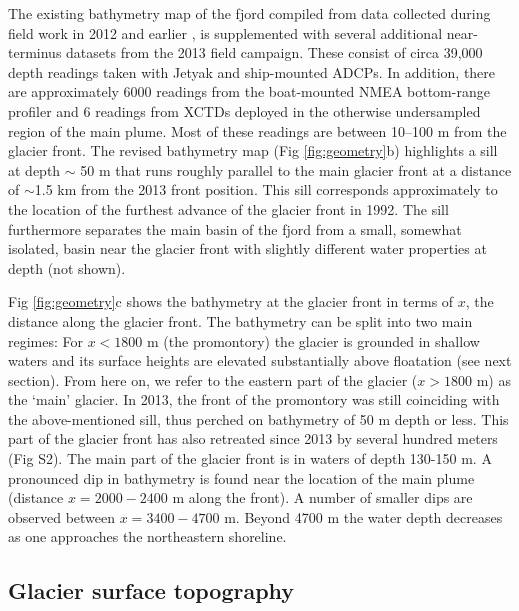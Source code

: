 \documentclass[30pt,letterpaper]{article}
\begin{document}
The existing bathymetry map of the fjord compiled from data collected during field work in 2012 and earlier \citep{Stevens:2016tx}, is supplemented with several additional near-terminus datasets from the 2013 field campaign. These consist of circa 39,000 depth readings taken with Jetyak and ship-mounted ADCPs. In addition, there are approximately 6000 readings from the boat-mounted NMEA bottom-range profiler and 6 readings from XCTDs deployed in the otherwise undersampled region of the main plume. Most of these readings are between 10--100 m from the glacier front. The revised bathymetry map (Fig \ref{fig:geometry}b) highlights a sill at depth $\sim$ 50 m that runs roughly parallel to the main glacier front at a distance of $\sim$1.5 km from the 2013 front position. This sill corresponds approximately to the location of the furthest advance of the glacier front in 1992. The sill furthermore separates the main basin of the fjord from a small, somewhat isolated, basin near the glacier front with slightly different water properties at depth (not shown). 

Fig \ref{fig:geometry}c shows the bathymetry at the glacier front in terms of $x$, the distance along the glacier front. The bathymetry can be split into two main regimes: For $x < 1800$ m (the promontory) the glacier is grounded in shallow waters and its surface heights are elevated substantially above floatation (see next section). From here on, we refer to the eastern part of the glacier ($x > 1800$ m) as the `main' glacier. In 2013, the front of the promontory was still coinciding with the above-mentioned sill, thus perched on bathymetry of  50 m depth or less. This part of the glacier front has also retreated since 2013 by several hundred meters (Fig S2). The main part of the glacier front is in waters of depth 130-150 m. A pronounced dip in bathymetry is found near the location of the main plume (distance $x = 2000 - 2400$ m along the front). A number of smaller dips are observed between $x = 3400 - 4700$ m. Beyond 4700 m the water depth decreases as one approaches the northeastern shoreline.

\subsection{Glacier surface topography} \label{surface}
\end{document}

